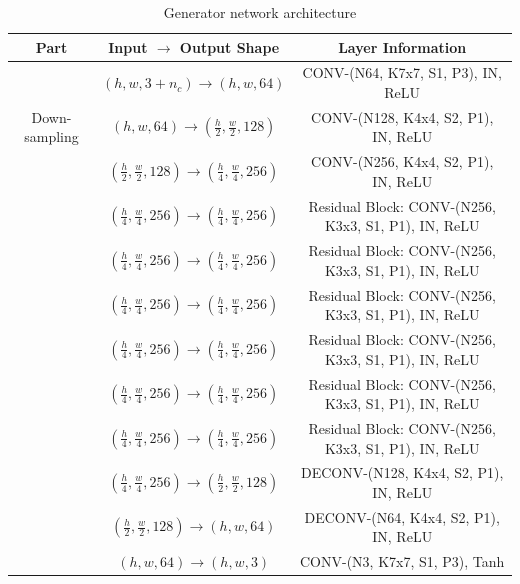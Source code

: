 \documentclass[10pt,twocolumn,letterpaper]{article}
\begin{document}
\begin{table}[h]
\setlength{\tabcolsep}{13pt}
\renewcommand{\arraystretch}{1.7}
\begin{center}
\begin{tabular}{c  c  c}
Part & Input $\rightarrow$ Output Shape & Layer Information \\
\hline \hline
\multirow{3}{*}{Down-sampling} & $(h, w, 3+{n}_{c}) \rightarrow (h, w, 64)$ & CONV-(N64, K7x7, S1, P3), IN, ReLU \\
& $(h, w, 64) \rightarrow (\frac{h}{2}, \frac{w}{2}, 128)$ & CONV-(N128, K4x4, S2, P1), IN, ReLU \\
& $(\frac{h}{2}, \frac{w}{2}, 128) \rightarrow (\frac{h}{4}, \frac{w}{4},256)$ & CONV-(N256, K4x4, S2, P1), IN, ReLU \\
\Xhline{1.0pt}
\multirow{6}{*}{Bottleneck} & $(\frac{h}{4}, \frac{w}{4}, 256) \rightarrow (\frac{h}{4}, \frac{w}{4}, 256)$ & Residual Block: CONV-(N256, K3x3, S1, P1), IN, ReLU\\
 & $(\frac{h}{4}, \frac{w}{4}, 256) \rightarrow (\frac{h}{4}, \frac{w}{4}, 256)$ &  Residual Block: CONV-(N256, K3x3, S1, P1), IN, ReLU \\
 & $(\frac{h}{4}, \frac{w}{4}, 256) \rightarrow (\frac{h}{4}, \frac{w}{4}, 256)$ &   Residual Block: CONV-(N256, K3x3, S1, P1), IN, ReLU  \\
 & $(\frac{h}{4}, \frac{w}{4}, 256) \rightarrow (\frac{h}{4}, \frac{w}{4}, 256)$ &   Residual Block: CONV-(N256, K3x3, S1, P1), IN, ReLU  \\
 & $(\frac{h}{4}, \frac{w}{4}, 256) \rightarrow (\frac{h}{4}, \frac{w}{4}, 256)$ &   Residual Block: CONV-(N256, K3x3, S1, P1), IN, ReLU  \\
 & $(\frac{h}{4}, \frac{w}{4}, 256) \rightarrow (\frac{h}{4}, \frac{w}{4}, 256)$ &   Residual Block: CONV-(N256, K3x3, S1, P1), IN, ReLU  \\
\Xhline{1.0pt}
\multirow{3}{*}{Up-sampling} & $(\frac{h}{4}, \frac{w}{4}, 256) \rightarrow (\frac{h}{2}, \frac{w}{2}, 128)$ & DECONV-(N128, K4x4, S2, P1), IN, ReLU \\
 & $(\frac{h}{2}, \frac{w}{2}, 128) \rightarrow (h, w, 64)$ & DECONV-(N64, K4x4, S2, P1), IN, ReLU \\
 & $(h, w, 64) \rightarrow (h, w, 3)$ & CONV-(N3, K7x7, S1, P3), Tanh \\
\hline
\hline
\end{tabular}
\end{center}
\caption{Generator network architecture}
\label{table5}
\end{table}
\end{document}
